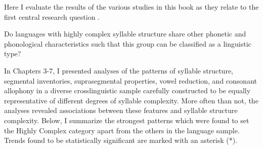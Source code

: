   Here I evaluate the results of the various studies in this book as they relate to the first central research question .

\ea\label{ex:8.1}
   {Do languages with highly complex syllable structure share other phonetic and phonological characteristics such that this group can be classified as a linguistic type?}
\z

  In Chapters 3-7, I presented analyses of the patterns of syllable structure, segmental inventories, suprasegmental properties, vowel reduction, and consonant allophony in a diverse crosslinguistic sample carefully constructed to be equally representative of different degrees of syllable complexity. More often than not, the analyses revealed associations between these features and syllable structure complexity. Below, I summarize the strongest patterns which were found to set the Highly Complex category apart from the others in the language sample. Trends found to be statistically significant are marked with an asterisk (*).

